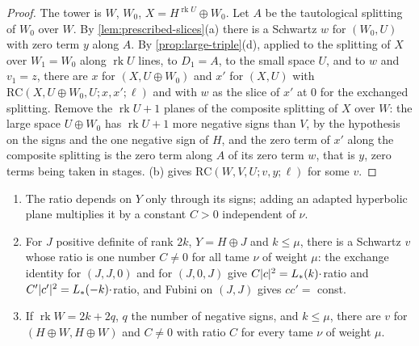 \begin{proof}
The tower is $W$, $W_0$, $X=H^{\operatorname{rk}U}\oplus W_0$. Let $A$ be the tautological splitting of $W_0$ over $W$. By \cref{lem:prescribed-slices}(a) there is a Schwartz $w$ for $(W_0,U)$ with zero term $y$ along $A$.
By \cref{prop:large-triple}(d), applied to the splitting of $X$ over $W_1=W_0$ along $\operatorname{rk}U$ lines, to $D_1=A$, to the small space $U$, and to $w$ and $v_1=z$, there are $x$ for $(X,U\oplus W_0)$ and $x'$ for
$(X,U)$ with $\mathrm{RC}(X,U\oplus W_0,U;x,x';\ell)$ and with $w$ as the slice of $x'$ at $0$ for the exchanged splitting. Remove the $\operatorname{rk}U+1$ planes of the composite splitting of $X$ over $W$: the large
space $U\oplus W_0$ has $\operatorname{rk}U+1$ more negative signs than $V$, by the hypothesis on the signs and the one negative sign of $H$, and the zero term of $x'$ along the composite splitting is the zero term
along $A$ of its zero term $w$, that is $y$, zero terms being taken in stages. (b) gives $\mathrm{RC}(W,V,U;v,y;\ell)$ for some $v$.
\end{proof}

\begin{proposition}\label{prop:equal-rank-ratio}
\begin{enumerate}[label=\textup{(\alph*)}]
\item The ratio depends on $Y$ only through its signs; adding an adapted hyperbolic plane multiplies it by a constant $C>0$ independent of $\nu$.
\item For $J$ positive definite of rank $2k$, $Y=H\oplus J$ and $k\le\mu$, there is a Schwartz $v$ whose ratio is one number $C\ne0$ for all tame $\nu$ of weight $\mu$: the exchange identity for
$(J,J,0)$ and for $(J,0,J)$ give $C\lvert c\rvert^2=L_*(k)\cdot$ratio and $C'\lvert c'\rvert^2=L_*(-k)\cdot$ratio, and Fubini on $(J,J)$ gives $cc'=$ const.
\item If $\operatorname{rk}W=2k+2q$, $q$ the number of negative signs, and $k\le\mu$, there are $v$ for $(H\oplus W,H\oplus W)$ and $C\ne0$ with ratio $C$ for every tame $\nu$ of weight $\mu$.
\end{enumerate}
\end{proposition}

